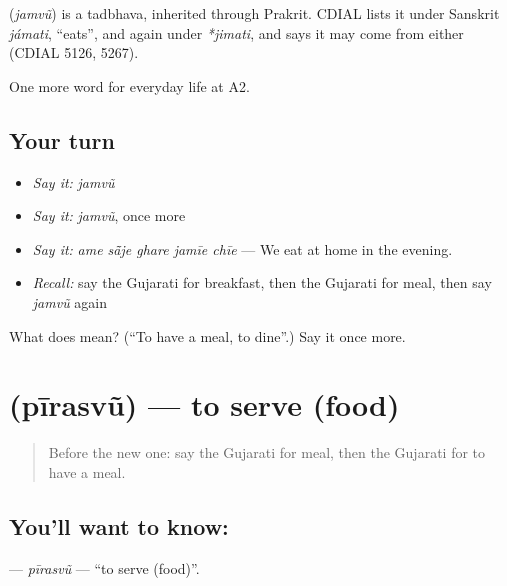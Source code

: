 \begin{cousinweb}
\textbf{} (\emph{jamvũ}) is a tadbhava, inherited through Prakrit. CDIAL lists it under Sanskrit \emph{jámati}, \textquotedblleft{}eats\textquotedblright{}, and again under \emph{*jimati}, and says it may come from either (CDIAL 5126, 5267).
\end{cousinweb}

\begin{grammarlens}[title={What you've built}]
One more word for everyday life at A2.
\end{grammarlens}

\subsection*{Your turn}
\begin{itemize}
\raggedright
  \item \emph{Say it:} \emph{jamvũ}
  \item \emph{Say it:} \emph{jamvũ}, once more
  \item \emph{Say it:} \emph{ame sā̃je ghare jamīe chīe} — We eat at home in the evening.
  \item \emph{Recall:} say the Gujarati for breakfast, then the Gujarati for meal, then say \emph{jamvũ} again
\end{itemize}

\begin{tcolorbox}[breakable,colback=teal!4,colframe=teal!35!black,title={Before you move on}]
What does  mean? (\textquotedblleft{}To have a meal, to dine\textquotedblright{}.) Say it once more.
\end{tcolorbox}
\section[\texorpdfstring{\gu{પીરસવું} (pīrasvũ)}{પીરસવું (pīrasvũ)}]{ (pīrasvũ) — to serve (food)}

\label{lesson:GU-C163-pirasvu}



\begin{quote}
Before the new one: say the Gujarati for meal, then the Gujarati for to have a meal.
\end{quote}

\subsection*{You'll want to know: }
\textbf{} — \emph{pīrasvũ} — \textquotedblleft{}to serve (food)\textquotedblright{}.

